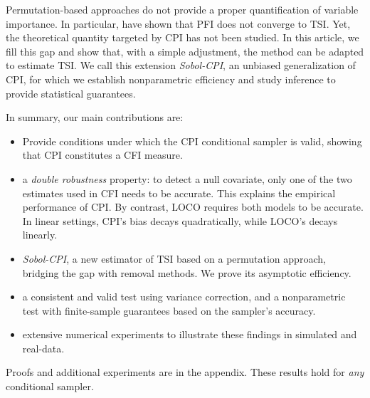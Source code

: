 \documentclass{article}
\theoremstyle{plain}
\theoremstyle{definition}
\theoremstyle{remark}
\begin{document}
Permutation-based approaches do not provide a proper quantification of variable importance.
%
In particular, \citet{scornet2022mda} have shown that PFI does not converge to TSI. Yet, the theoretical quantity targeted by CPI has not been studied. %
%
%
In this article, we fill this gap and show that, with a simple adjustment, the method can be adapted to estimate TSI. We call this extension \textit{Sobol-CPI}, an unbiased generalization of CPI, for which we establish nonparametric efficiency and study inference to provide statistical guarantees.

In summary, our main contributions are:
\begin{itemize}
    \item Provide conditions under which the CPI conditional sampler is valid, showing that CPI constitutes a CFI measure.
    \item a \textit{double robustness} property: to detect a null covariate, only one of the two estimates used in CFI needs to be accurate. This explains the empirical performance of CPI. By contrast, LOCO requires both models to be accurate. In linear settings, CPI’s bias decays quadratically, while LOCO’s decays linearly.
    \item \textit{Sobol-CPI}, a new estimator of TSI based on a permutation approach, bridging the gap with removal methods. We prove its asymptotic efficiency.
    \item a consistent and valid test using variance correction, and a nonparametric test with finite-sample guarantees based on the sampler’s accuracy.
    \item extensive numerical experiments to illustrate these findings in simulated and real-data.
\end{itemize}
Proofs and additional experiments are in the appendix. These results hold for \textit{any} conditional sampler.
\end{document}
